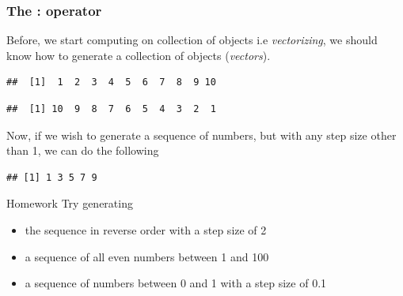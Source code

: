 \documentclass[12pt]{book}\usepackage{knitr}
\begin{document}
\subsubsection{The : operator}
\noindent Before, we start computing on collection of objects i.e \emph{vectorizing}, we should know how to generate a collection of objects (\emph{vectors}). 
\begin{knitrout}
\color{fgcolor}\begin{kframe}
\begin{alltt}
\hlopt{:} 
\end{alltt}
\begin{verbatim}
##  [1]  1  2  3  4  5  6  7  8  9 10
\end{verbatim}
\begin{alltt}
\hlopt{:} 
\end{alltt}
\begin{verbatim}
##  [1] 10  9  8  7  6  5  4  3  2  1
\end{verbatim}
\end{kframe}
\end{knitrout}
\noindent Now, if we wish to generate a sequence of numbers, but with any step size other than 1, we can do the following
\begin{knitrout}
\color{fgcolor}\begin{kframe}
\begin{alltt}
\hlstd{(}\hlstd{,}\hlstd{,}\hlstd{=}\hlstd{)} 
\end{alltt}
\begin{verbatim}
## [1] 1 3 5 7 9
\end{verbatim}
\end{kframe}
\end{knitrout}
\begin{DIY}{Homework}
Try generating
\begin{itemize}
  \item the sequence in reverse order with a step size of 2
  \item a sequence of all even numbers between 1 and 100
  \item a sequence of numbers between 0 and 1 with a step size of 0.1
\end{itemize}
\end{DIY}
\end{document}
